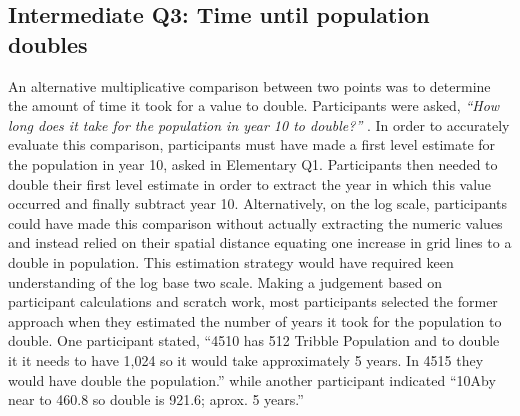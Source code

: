 \documentclass[print]{nuthesis}
\begin{document}
\hypertarget{intermediate-q3-time-until-population-doubles}{%
\subsection{Intermediate Q3: Time until population doubles}\label{intermediate-q3-time-until-population-doubles}}

An alternative multiplicative comparison between two points was to determine the amount of time it took for a value to double.
Participants were asked, \emph{``How long does it take for the population in year 10 to double?''} .
In order to accurately evaluate this comparison, participants must have made a first level estimate for the population in year 10, asked in Elementary Q1.
Participants then needed to double their first level estimate in order to extract the year in which this value occurred and finally subtract year 10.
Alternatively, on the log scale, participants could have made this comparison without actually extracting the numeric values and instead relied on their spatial distance equating one increase in grid lines to a double in population.
This estimation strategy would have required keen understanding of the log base two scale.
Making a judgement based on participant calculations and scratch work, most participants selected the former approach when they estimated the number of years it took for the population to double.
One participant stated, ``4510 has 512 Tribble Population and to double it it needs to have 1,024 so it would take approximately 5 years. In 4515 they would have double the population.'' while another participant indicated ``10Aby near to 460.8 so double is 921.6; aprox. 5 years.''
\end{document}
